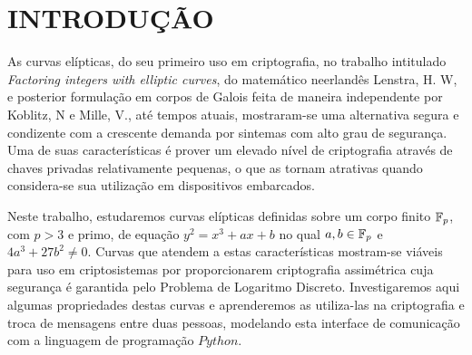 \section{INTRODUÇÃO}
	
	As curvas elípticas, do seu primeiro uso em criptografia, no trabalho intitulado \textit{Factoring integers with elliptic curves}, do matemático neerlandês Lenstra, H. W, e posterior formulação em corpos de Galois feita de maneira independente por Koblitz, N e Mille, V., até tempos atuais, mostraram-se uma alternativa segura e condizente com a crescente demanda por sintemas com alto grau de segurança. Uma de suas características é prover um elevado nível de criptografia através de chaves privadas relativamente pequenas, o que as tornam atrativas quando considera-se sua utilização em dispositivos embarcados.
	
	Neste trabalho, estudaremos curvas elípticas definidas sobre um corpo finito $\mathbb{F}_p$, com $p > 3$ e primo, de equação $y^2 = x^3 + ax + b$ no qual $a, b \in \mathbb{F}_p$ e $4a^3 + 27b^2 \neq 0$. Curvas que atendem a estas características mostram-se viáveis para uso em criptosistemas por proporcionarem criptografia assimétrica cuja segurança é garantida pelo Problema de Logaritmo Discreto. Investigaremos aqui algumas propriedades destas curvas e aprenderemos as utiliza-las na criptografia e troca de mensagens entre duas pessoas, modelando esta interface de comunicação com a linguagem de programação $Python$.
